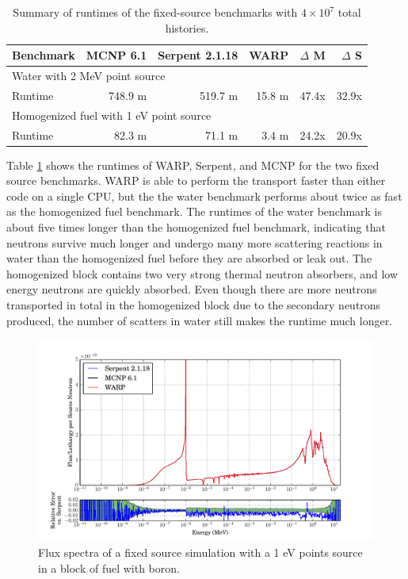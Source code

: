 \begin{table}[h]
\centering
\caption{Summary of runtimes of the fixed-source benchmarks with $4\times10^7$ total histories.}
\label{fixed_summary}
\begin{tabular}{| l | r | r | r | r | r |}
 \hline
 Benchmark & MCNP 6.1 & Serpent 2.1.18 & WARP & $\Delta$ M & $\Delta$ S  \\
\hline
\hline
\multicolumn{6}{|l|}{Water with 2 MeV point source }  \\
\hline
 Runtime               &  748.9 m & 519.7 m & 15.8 m & 47.4x  & 32.9x  \\
 \hline
 \hline
\multicolumn{6}{|l|}{Homogenized fuel with 1 eV point source }\\
\hline
 Runtime               &  82.3 m &  71.1 m &  3.4 m & 24.2x  & 20.9x  \\
 \hline
\end{tabular}
\end{table}

Table \ref{fixed_summary} shows the runtimes of WARP, Serpent, and MCNP for the two fixed source benchmarks.  WARP is able to perform the transport faster than either code on a single CPU, but the the water benchmark performs about twice as fast as the homogenized fuel benchmark.  The runtimes of the water benchmark is about five times longer than the homogenized fuel benchmark, indicating that neutrons survive much longer and undergo many more scattering reactions in water than the homogenized fuel before they are absorbed or leak out.  The homogenized block contains two very strong thermal neutron absorbers, and low energy neutrons are quickly absorbed.  Even though there are more neutrons transported in total in the homogenized block due to the secondary neutrons produced, the number of scatters in water still makes the runtime much longer.

\begin{figure}[h!]
\centering
\includegraphics[width=\textwidth,trim= 1cm 0cm 1cm 0cm]{graphics/finalresults/fixed_spec_homfuel.pdf}
\caption{Flux spectra of a fixed source simulation with a 1 eV points source in a block of fuel with boron. \label{fixed_spec_homfuel} }
\end{figure}

